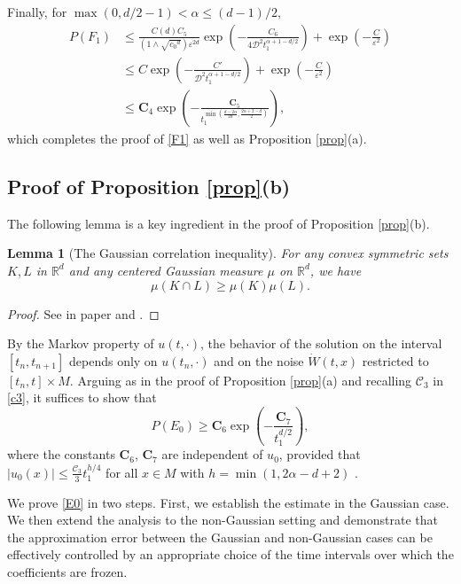 \documentclass[12pt]{amsart}
\newtheorem{lemma}{Lemma}[section]
\numberwithin{equation}{section}
\newcommand{\R}{\mathbb{R}}
\newcommand{\1}{\mathbf{1}}
\begin{document}
Finally, for $\max(0,d/2-1)<\alpha\leq (d-1)/2$,
\begin{equation*}
\begin{split}
P(F_{1})&\leq \frac{C(d)C_5}{(1\wedge \sqrt{{c_0}^d})\varepsilon^{2d}}\exp\left(-\frac{C_6}{4\mathcal{D}^2t_1^{\alpha+1-d/2}}\right)+\exp\left(-\frac{C}{\varepsilon^2}\right)\\
&\leq C\exp\left(-\frac{C'}{\mathcal{D}^2t_1^{\alpha+1-d/2}}\right)+\exp\left(-\frac{C}{\varepsilon^2}\right)\\
&\leq\textbf{C}_4\exp\left(-\frac{\textbf{C}_5}{t_1^{\min\left(\frac{d-2\alpha}{2d},\frac{2\alpha+2-d}{2}\right)}}\right),
\end{split}
\end{equation*}
which completes the proof of \eqref{F1} as well as Proposition \ref{prop}(a).

\subsection*{Proof of Proposition \ref{prop}(b)} The following lemma is a key ingredient in the proof of Proposition \ref{prop}(b).
\begin{lemma}[The Gaussian correlation inequality]\label{Gaussiancorr}For any convex symmetric sets $K, L$ in $\R^d$ and any centered Gaussian measure $\mu$ on $\R^d$, we have
\[
\mu(K\cap L)\geq \mu(K)\mu(L).
\]
\end{lemma}
\begin{proof}
See in paper \cite{royen2014simple} and \cite{latala2017royen}. 
\end{proof}

By the Markov property of $u(t,\cdot)$, the behavior of the solution on the interval $[t_n,t_{n+1}]$ depends only on $u(t_n,\cdot)$ and on the noise $\dot{W}(t,x)$ restricted to $[t_n,t]\times M$. Arguing as in the proof of Proposition \ref{prop}(a) and recalling $\mathcal{C}_3$ in \eqref{c3}, it suffices to show that
\begin{equation}
\label{E0}
P\left(E_{0}\right)\geq  \textbf{C}_6\exp\left(-\frac{\textbf{C}_7}{t_1^{d/2}}\right),
\end{equation}
where the constants $\textbf{C}_6$, $\textbf{C}_7$ are independent of $u_0$, provided that $\vert u_0(x)\vert\leq \frac{\mathcal{C}_3}{3}t_1^{h/4}$ for all $x\in M$ with $h=\min(1,2\alpha-d+2)$ .

We prove \eqref{E0} in two steps. First, we establish the estimate in the Gaussian case. We then extend the analysis to the non-Gaussian setting and demonstrate that the approximation error between the Gaussian and non-Gaussian cases can be effectively controlled by an appropriate choice of the time intervals over which the coefficients are frozen.
\end{document}
